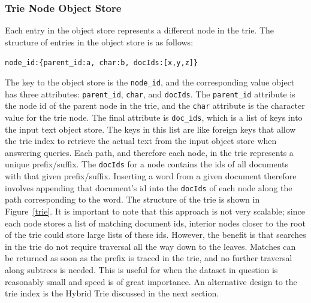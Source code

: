 \documentclass{vldb}
\begin{document}
\subsubsection{Trie Node Object Store}
Each entry in the object store represents a different node in the trie. The structure of entries in the object store is as follows:
\begin{center}
\texttt{node\_id:\{parent\_id:a, char:b, docIds:[x,y,z]\}}
\end{center}
The key to the object store is the \texttt{node\_id}, and the corresponding value object has three attributes: \texttt{parent\_id}, \texttt{char}, and \texttt{docIds}. The \texttt{parent\_id} attribute is the node id of the parent node in the trie, and the \texttt{char} attribute is the character value for the trie node. The final attribute is \texttt{doc\_ids}, which is a list of keys into the input text object store. The keys in this list are like foreign keys that allow the trie index to retrieve the actual text from the input object store when answering queries. Each path, and therefore each node, in the trie represents a unique prefix/suffix. The \texttt{docIds} for a node contains the ids of all documents with that given prefix/suffix. Inserting a word from a given document therefore involves appending that document's id into the \texttt{docIds} of each node along the path corresponding to the word. The structure of the trie is shown in Figure~\ref{trie}.  It is important to note that this approach is not very scalable; since each node stores a list of matching document ids, interior nodes closer to the root of the trie could store large lists of these ids. However, the benefit is that searches in the trie do not require traversal all the way down to the leaves. Matches can be returned as soon as the prefix is traced in the trie, and no further traversal along subtrees is needed. This is useful for when the dataset in question is reasonably small and speed is of great importance. An alternative design to the trie index is the Hybrid Trie discussed in the next section.
\end{document}
